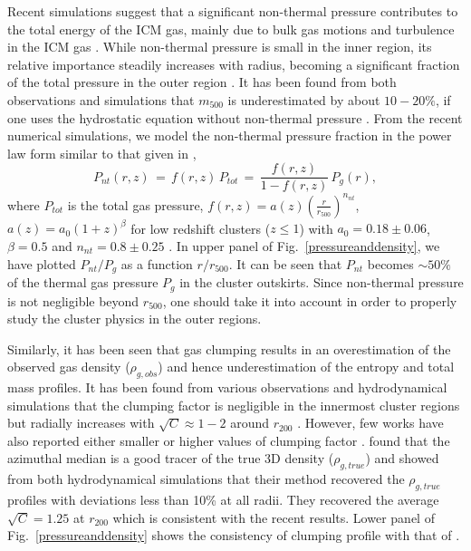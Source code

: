 \documentclass[a4paper,fleqn,usenatbib]{mnras}
\begin{document}
Recent simulations suggest that a significant non-thermal pressure contributes to the total energy of the ICM gas, mainly due to bulk gas motions 
and turbulence in the ICM gas \citep{Vazza2009,Battaglia2012,Shi2015}. 
While non-thermal pressure is small in the inner region, its relative importance steadily increases with radius, becoming a significant fraction of the total pressure in the outer region \citep{Lau2009}. It has been found from both observations and simulations that $m_{500}$ is underestimated by about $10-20\%$, if one uses the hydrostatic equation without non-thermal pressure \citep{Rasia2004,Shi2015}.
From the recent numerical simulations, we model the non-thermal pressure fraction in the power law form similar to that given in \cite{Shaw2010},
\begin{equation}
 P_{nt}(r,z)\,=\,f(r,z)\,P_{tot}\,=\,\frac{f(r,z)}{1-f(r,z)}\,P_g(r),
 \label{eqn2:eq2}
\end{equation}
where $P_{tot}$ is the total gas pressure, $f(r,z)=a(z)\left(\frac{r}{r_{500}}\right)^{n_{ nt}}$, $a(z)=a_0(1+z)^{\beta}$ for low redshift clusters ($z\le1$) with $a_0=0.18\pm0.06$, $\beta=0.5$ and $n_{nt}=0.8\pm0.25$ \citep{Shaw2010}.
In upper panel of Fig.~\ref{pressureanddensity}, we have plotted $P_{nt}/P_{g}$ as a function  $r/r_{500}$. It can be seen that $P_{nt}$ becomes  $\sim50\%$ of the thermal gas pressure $P_{g}$ in the cluster outskirts. 
Since non-thermal pressure is not negligible beyond $r_{500}$, one should take it into account in order to properly study the cluster physics in the outer regions. 

Similarly, it has been seen that gas clumping results in an overestimation of the observed gas density ($\rho_{g,obs}$) and hence underestimation of the entropy and total mass profiles. It has been found from various observations and hydrodynamical simulations that the clumping factor is negligible in the innermost cluster regions but radially increases with $\sqrt C\approx1-2$ around $r_{200}$ \citep{Mathiesen1999,Nagai2011,Vazza2013,Battaglia2015}. However, few works have also reported either smaller or higher values of clumping factor \citep{Walker2013,Femiano2013,Urban2014,Femiano2014}. 
\cite{Eckert2015} found that the azimuthal median is a good tracer of the true 3D density ($\rho_{g,true}$) and showed from both  hydrodynamical simulations that their method recovered the $\rho_{g,true}$ profiles with  deviations less than 10\% at all radii. They recovered the average  $\sqrt C=1.25$ at $r_{200}$ which is consistent with the recent results. Lower panel of Fig.~\ref{pressureanddensity}  shows the consistency of \cite{Eckert2015} clumping profile with that of \cite{Battaglia2015}.
\end{document}
